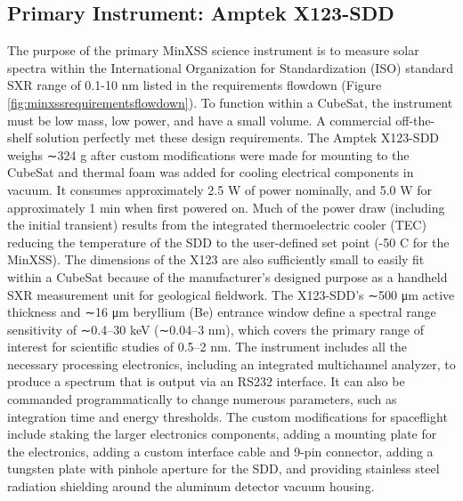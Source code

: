 \subsection{Primary Instrument: Amptek X123-SDD}
The purpose of the primary MinXSS science instrument is to measure solar spectra within the International Organization for Standardization (ISO) standard SXR range of 0.1-10 nm listed in the requirements flowdown (Figure \ref{fig:minxssrequirementsflowdown}). To function within a CubeSat, the instrument must be low mass, low power, and have a small volume. A commercial off-the-shelf solution perfectly met these design requirements. The Amptek X123-SDD weighs ∼324 g after custom modifications were made for mounting to the CubeSat and thermal foam was added for cooling electrical components in vacuum. It consumes approximately 2.5 W of power nominally, and 5.0 W for approximately 1 min when first powered on. Much of the power draw (including the initial transient) results from the integrated thermoelectric cooler (TEC) reducing the temperature of the SDD to the user-defined set point (-50 \degree C for the MinXSS). The dimensions of
the X123 are also sufficiently small to easily fit within a CubeSat because of the manufacturer’s designed purpose as a handheld SXR measurement unit for geological fieldwork. The X123-SDD's ∼500 μm active thickness and ∼16 μm beryllium (Be) entrance window define a spectral range sensitivity of ∼0.4–30 keV (∼0.04–3 nm), which covers the primary range of interest for scientific studies of 0.5–2 nm. The instrument includes all the necessary processing electronics, including an integrated multichannel analyzer, to produce a spectrum that is output via an RS232 interface. It can also be commanded programmatically to change numerous parameters, such as integration time and energy thresholds. The custom modifications for spaceflight include staking the larger electronics components, adding a mounting plate for the electronics, adding a custom interface cable and 9-pin connector, adding a tungsten plate with pinhole aperture for the SDD, and providing stainless steel radiation shielding around the aluminum detector vacuum housing.

